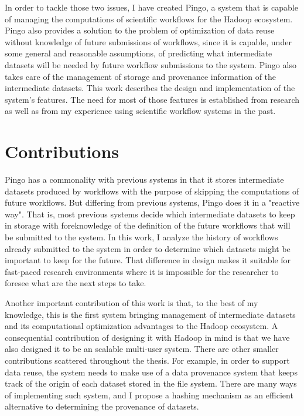 In order to tackle those two issues, I have created Pingo, a system that is capable of managing the computations of scientific workflows for the Hadoop ecosystem. Pingo also provides a solution to the problem of optimization of data reuse without knowledge of future submissions of workflows, since it is capable, under some general and reasonable assumptions, of predicting what intermediate datasets will be needed by future workflow submissions to the system. Pingo also takes care of the management of storage and provenance information of the intermediate datasets. This work describes the design and implementation of the system's features.  The need for most of those features is established from research as well as from my experience using scientific workflow systems in the past. 

\section{Contributions}
Pingo has a commonality with previous systems \citep{altintas2004kepler, yuan2012data, deelman2015pegasus} in that it stores intermediate datasets produced by workflows with the purpose of skipping the computations of future workflows. But differing from previous systems, Pingo does it in a "reactive way".  That is, most previous systems decide which intermediate datasets to keep in storage with foreknowledge of the definition of the future workflows that will be submitted to the system.  In this work, I analyze the history of workflows already submitted to the system in order to determine which datasets might be important to keep for the future. That difference in design makes it suitable for fast-paced research environments where it is impossible for the researcher to foresee what are the next steps to take.

Another important contribution of this work is that, to the best of my knowledge, this is the first system bringing management of intermediate datasets and its computational optimization advantages to the Hadoop ecosystem.  A consequential contribution of designing it with Hadoop in mind is that we have also designed it to be an scalable multi-user system.  There are other smaller contributions scattered throughout the thesis. For example, in order to support data reuse, the system needs to make use of a data provenance system that keeps track of the origin of each dataset stored in the file system. There are many ways of implementing such system, and I propose a hashing mechanism as an efficient alternative to determining the provenance of datasets.  

